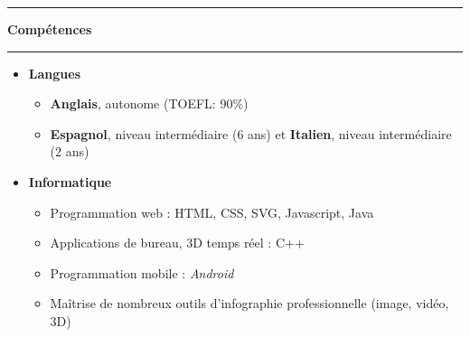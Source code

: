 \documentclass[a4paper,11pt]{article} %
\newcommand{\trad}[2]{#2}
\newcommand{\titre}[1]{%
	\begin{center}
	\rule{\textwidth}{1pt}
	\par
	\vspace{0.1cm}
        \textbf{\large #1}
	\par\rule{\textwidth}{1pt}
	\end{center}
	}
\newenvironment{customitemize}[0]
  { \begin{itemize}
    \addtolength{\itemsep}{\trad{-0.2}{0}\baselineskip}
    \addtolength{\baselineskip}{\trad{-0.2}{0}\baselineskip} }
  { \end{itemize} }
\begin{document}
\titre{\trad{Competences}{Compétences}}

\begin{customitemize}
\item \textbf{\trad{Languages}{Langues}}
	\begin{itemize} 
	\trad{\item \textbf{French}, mother tongue}{}
	\item \trad{\textbf{English}, fluent (TOEFL: 90\%)} %
				{\textbf{Anglais}, autonome (TOEFL: 90\%)} %
	\item \trad{\textbf{Spanish}, intermediate (6 years) and \textbf{Italian}, intermediate (2 years)} %
				{\textbf{Espagnol}, niveau intermédiaire (6 ans) et \textbf{Italien}, niveau intermédiaire (2 ans)}
	\end{itemize}
\item \textbf{\trad{Computer}{Informatique}}
	\begin{itemize}
	\item \trad{Web: HTML, CSS, SVG, Javascript, Java}											{Programmation web : HTML, CSS, SVG, Javascript, Java}
	\item \trad{Desktop applications and real time 3D: C++}										{Applications de bureau, 3D temps réel : C++}
	\item \trad{Mobile: \textit{Android}}									  					{Programmation mobile : \textit{Android}}
	\item \trad{Knowledge of many digital art applications}							            {Maîtrise de nombreux outils d'infographie professionnelle (image, vidéo, 3D)}
	\end{itemize}
\end{customitemize}
\end{document}
